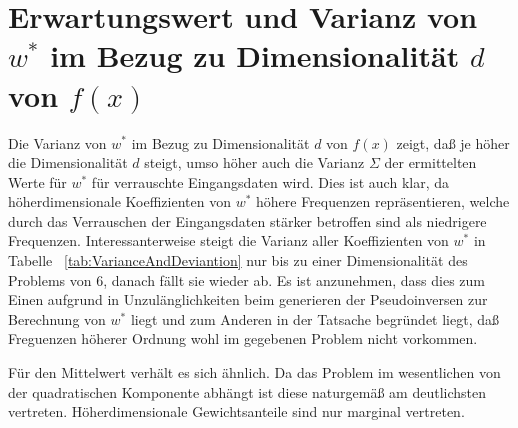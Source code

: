 \documentclass[]{report}
\begin{document}
\section{Erwartungswert und Varianz von $w^*$ im Bezug zu Dimensionalit\"at $d$ von $f(x)$}

Die Varianz von $w^*$ im Bezug zu Dimensionalit\"at $d$ von $f(x)$ zeigt, da{\ss} je h\"oher die Dimensionalit\"at $d$ steigt, umso h\"oher auch die Varianz $\Sigma$ der ermittelten Werte f\"ur $w^*$ f\"ur verrauschte Eingangsdaten wird. Dies ist auch klar, da h\"oherdimensionale Koeffizienten von $w^*$ h\"ohere Frequenzen repr\"asentieren, welche durch das Verrauschen der Eingangsdaten st\"arker betroffen sind als niedrigere Frequenzen.
Interessanterweise steigt die Varianz aller Koeffizienten von $w^*$ in Tabelle ~\ref{tab:VarianceAndDeviantion} nur bis zu einer Dimensionalit\"at des Problems von $6$, danach f\"allt sie wieder ab. Es ist anzunehmen, dass dies zum Einen aufgrund in Unzul\"anglichkeiten beim generieren der Pseudoinversen zur Berechnung von $w^*$ liegt und zum Anderen in der Tatsache begr\"undet liegt, da{\ss} Freguenzen h\"oherer Ordnung wohl im gegebenen Problem nicht vorkommen.

F\"ur den Mittelwert verh\"alt es sich \"ahnlich. Da das Problem im wesentlichen von der quadratischen Komponente abh\"angt ist diese naturgem\"a{\ss} am deutlichsten vertreten.
H\"oherdimensionale Gewichtsanteile sind nur marginal vertreten.
\end{document}
